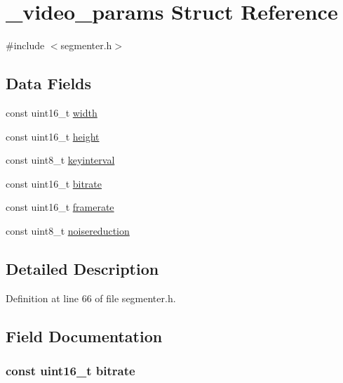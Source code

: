 \hypertarget{struct__video__params}{\section{\-\_\-video\-\_\-params \-Struct \-Reference}
\label{struct__video__params}
}


{\ttfamily \#include $<$segmenter.\-h$>$}

\subsection*{\-Data \-Fields}
\begin{DoxyCompactItemize}
\item 
const uint16\-\_\-t \hyperlink{struct__video__params_a9751eb6040d62275201c4b184f1657cf}{width}
\item 
const uint16\-\_\-t \hyperlink{struct__video__params_a08b719f21fdd4b4a8646070080cccbf9}{height}
\item 
const uint8\-\_\-t \hyperlink{struct__video__params_a742eca362410fabc25b1403e42afdf6f}{keyinterval}
\item 
const uint16\-\_\-t \hyperlink{struct__video__params_a90d9d9cc76bdecc14ce1bcda108dbc6c}{bitrate}
\item 
const uint16\-\_\-t \hyperlink{struct__video__params_a1d547da47827122cb857d138cd40d03d}{framerate}
\item 
const uint8\-\_\-t \hyperlink{struct__video__params_a55d36111de9687dc3e70d2aaeb13c47f}{noisereduction}
\end{DoxyCompactItemize}


\subsection{\-Detailed \-Description}


\-Definition at line 66 of file segmenter.\-h.



\subsection{\-Field \-Documentation}
\hypertarget{struct__video__params_a90d9d9cc76bdecc14ce1bcda108dbc6c}{
\subsubsection[{bitrate}]{\setlength{\rightskip}{0pt plus 5cm}const uint16\-\_\-t {\bf bitrate}}}\label{struct__video__params_a90d9d9cc76bdecc14ce1bcda108dbc6c}



